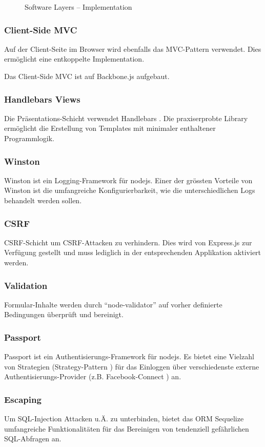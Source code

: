 \begin{figure}[ht!]
	\centering{
		
	}

	\caption{Software Layers -- Implementation}
\end{figure}

\subsubsection*{Client-Side MVC}
Auf der Client-Seite im Browser wird ebenfalls das MVC-Pattern \cite{MVC}verwendet. Dies ermöglicht eine entkoppelte Implementation.

Das Client-Side MVC ist auf Backbone.js \cite{Backbonejs} aufgebaut.

\subsubsection*{Handlebars Views}
Die Präsentations-Schicht verwendet Handlebars \cite{Handlebars}. Die praxiserprobte Library ermöglicht die Erstellung von Templates mit minimaler enthaltener Programmlogik.

\subsubsection*{Winston}
Winston \cite{Winston} ist ein Logging-Framework für \gls{nodejs}. Einer der grössten Vorteile von Winston ist die umfangreiche Konfigurierbarkeit, wie die unterschiedlichen Logs behandelt werden sollen.

\subsubsection*{CSRF}
\gls{CSRF}-Schicht um CSRF-Attacken zu verhindern. Dies wird von Express.js zur Verfügung gestellt \cite{ExpressjsCSRF} und muss lediglich in der entsprechenden Applikation aktiviert werden.

\subsubsection*{Validation}
Formular-Inhalte werden durch ``node-validator'' \cite{nodevalidator} auf vorher definierte Bedingungen überprüft und bereinigt.

\subsubsection*{Passport}
Passport \cite{Passportjs} ist ein Authentisierungs-Framework für \gls{nodejs}. Es bietet eine Vielzahl von Strategien (Strategy-Pattern \cite{StrategyPattern}) für das Einloggen über verschiedenste externe Authentisierungs-Provider (z.B. Facebook-Connect \cite{FacebookConnect}) an.

\subsubsection*{Escaping}
Um SQL-Injection \cite{sqlinjection} Attacken u.Ä. zu unterbinden, bietet das \gls{ORM} Sequelize \cite{Sequelize} umfangreiche Funktionalitäten für das Bereinigen von tendenziell gefährlichen \gls{SQL}-Abfragen an.